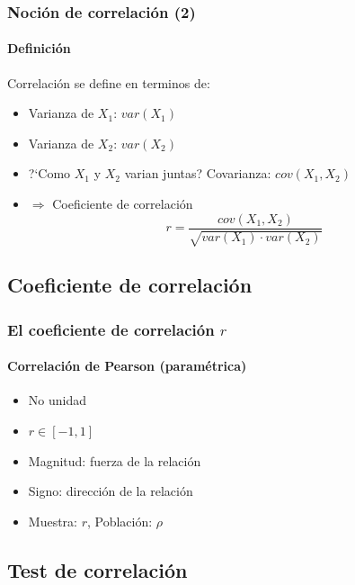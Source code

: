 \documentclass[mathserif]{beamer}
\begin{document}
 
\begin{frame}[label=introcorr2]
   \frametitle{Noci\'on de correlaci\'on (2)}
   \framesubtitle{Definici\'on}

    \begin{beamerboxesrounded}{\alert{Correlaci\'on} se define en terminos de:}
    \begin{itemize}[<+-| handout:1>]
      \item Varianza de $X_1$: $var(X_1) $
      \item Varianza de $X_2$: $var(X_2) $
      \item ?`Como $X_1$ y $X_2$ varian juntas? Covarianza: $cov(X_1, X_2)$
      \bigskip
      \item[] $\Rightarrow$ Coeficiente de correlaci\'on $$r=\frac{cov(X_1, X_2)}{\sqrt{var(X_1)\cdot var(X_2)}}$$
   \end{itemize}
   \end{beamerboxesrounded}
\end{frame}%


\subsection[Coeficiente de correlaci\'on]{Coeficiente de correlaci\'on}
 
\begin{frame}[label=corrcoeff]
   \frametitle{El coeficiente de correlaci\'on $r$}
   \framesubtitle{Correlaci\'on de Pearson (param\'etrica)}
    \begin{itemize}
      \item No unidad
      \item $r \in [-1,1]$
      \item Magnitud: fuerza de la relaci\'on
      \item Signo: direcci\'on de la relaci\'on
      \item Muestra: $r$, Poblaci\'on: $\rho$
   \end{itemize}
\end{frame}%


\subsection[Test]{Test de correlaci\'on}
 
\end{document}
